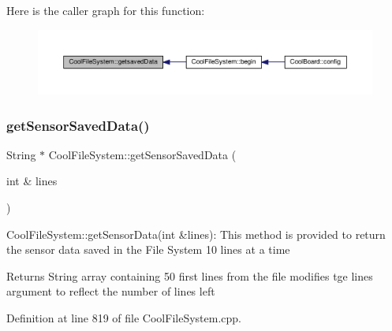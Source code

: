 Here is the caller graph for this function\+:\nopagebreak
\begin{figure}[H]
\begin{center}
\leavevmode
\includegraphics[width=350pt]{db/d0c/class_cool_file_system_a70701d05e811604af1b531f4f6dc69ed_icgraph}
\end{center}
\end{figure}
\mbox{\label{class_cool_file_system_a3223ffff4266a6300988fab956d6b4b2}} 
\subsubsection{\texorpdfstring{get\+Sensor\+Saved\+Data()}{getSensorSavedData()}}
{\footnotesize\ttfamily String $\ast$ Cool\+File\+System\+::get\+Sensor\+Saved\+Data (\begin{DoxyParamCaption}\item[{int \&}]{lines }\end{DoxyParamCaption})}

Cool\+File\+System\+::get\+Sensor\+Data(int \&lines)\+: This method is provided to return the sensor data saved in the File System 10 lines at a time

\begin{DoxyReturn}{Returns}
String array containing 50 first lines from the file modifies tge lines argument to reflect the number of lines left 
\end{DoxyReturn}


Definition at line 819 of file Cool\+File\+System.\+cpp.


